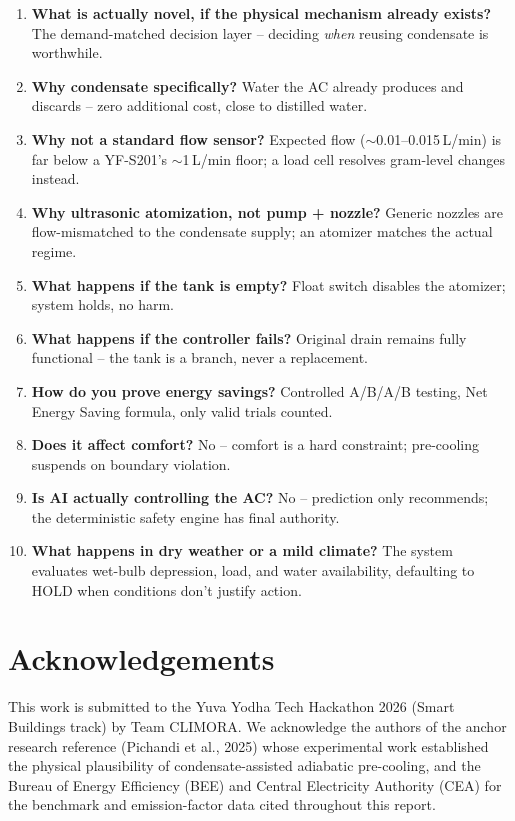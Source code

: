 \documentclass[11pt,a4paper]{article}
\begin{document}
\begin{enumerate}
    \item \textbf{What is actually novel, if the physical mechanism already exists?} The demand-matched decision layer -- deciding \emph{when} reusing condensate is worthwhile.
    \item \textbf{Why condensate specifically?} Water the AC already produces and discards -- zero additional cost, close to distilled water.
    \item \textbf{Why not a standard flow sensor?} Expected flow ($\sim$0.01--0.015\,L/min) is far below a YF-S201's $\sim$1\,L/min floor; a load cell resolves gram-level changes instead.
    \item \textbf{Why ultrasonic atomization, not pump + nozzle?} Generic nozzles are flow-mismatched to the condensate supply; an atomizer matches the actual regime.
    \item \textbf{What happens if the tank is empty?} Float switch disables the atomizer; system holds, no harm.
    \item \textbf{What happens if the controller fails?} Original drain remains fully functional -- the tank is a branch, never a replacement.
    \item \textbf{How do you prove energy savings?} Controlled A/B/A/B testing, Net Energy Saving formula, only valid trials counted.
    \item \textbf{Does it affect comfort?} No -- comfort is a hard constraint; pre-cooling suspends on boundary violation.
    \item \textbf{Is AI actually controlling the AC?} No -- prediction only recommends; the deterministic safety engine has final authority.
    \item \textbf{What happens in dry weather or a mild climate?} The system evaluates wet-bulb depression, load, and water availability, defaulting to HOLD when conditions don't justify action.
\end{enumerate}

\section*{Acknowledgements}
This work is submitted to the Yuva Yodha Tech Hackathon 2026 (Smart Buildings track) by Team CLIMORA. We acknowledge the authors of the anchor research reference (Pichandi et al., 2025) whose experimental work established the physical plausibility of condensate-assisted adiabatic pre-cooling, and the Bureau of Energy Efficiency (BEE) and Central Electricity Authority (CEA) for the benchmark and emission-factor data cited throughout this report.



\end{document}
